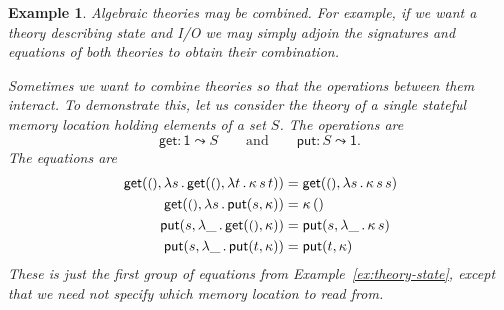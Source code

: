\documentclass{amsart}
\newcommand{\lam}[1]{\lambda #1 \,.\,}
\newcommand{\opdecl}[3]{#1 : #2 \leadsto #3} %
\newcommand{\one}{\mathsf{1}} %
\newcommand{\unit}{{\text{\small$()$}}} %
\newcommand{\kode}[1]{\mathsf{#1}}
\newcommand{\opcall}[3]{\kode{#1}(#2, #3)}
\newtheorem{example}{Example}[section]
\begin{document}
\begin{example}
  \label{ex:theory-single-state}
  Algebraic theories may be combined. For example, if we want a theory
  describing state and I/O we may simply adjoin the signatures and equations of
  both theories to obtain their combination.

  Sometimes we want to combine theories so that the operations between them
  interact. To demonstrate this, let us consider the theory of a single stateful
  memory location holding elements of a set $S$. The operations are
  \begin{equation*}
    \opdecl{\kode{get}}{\one}{S}
    \qquad\text{and}\qquad
    \opdecl{\kode{put}}{S}{\one}.
  \end{equation*}
  The equations are
  \begin{align}
    \label{eq:state-get-get}%
    \opcall{get}{\unit}{
      \lam{s}{
        \opcall{get}{\unit}{
        \lam{t} \kappa \, s \, t}
      }
    } &=
    \opcall{get}{\unit}{\lam{s}{\kappa \, s \, s}}
    \\
    \label{eq:state-get-put}%
    \opcall{get}{\unit}{
      \lam{s} \opcall{put}{s}{\kappa}
    } &=
    \kappa \, ()
    \\
    \label{eq:state-put-get}%
    \opcall{put}{s}{
      \lam{\_} \opcall{get}{\unit}{\kappa}
    } &=
    \opcall{put}{s}{\lam{\_} \kappa \, s}
    \\
    \label{eq:state-put-put}%
    \opcall{put}{s}{
      \lam{\_} \opcall{put}{t}{\kappa}
    } &=
    \opcall{put}{t}{\kappa}
  \end{align}
  These is just the first group of equations from Example~\ref{ex:theory-state},
  except that we need not specify which memory location to read from. 


\end{example}
\end{document}
